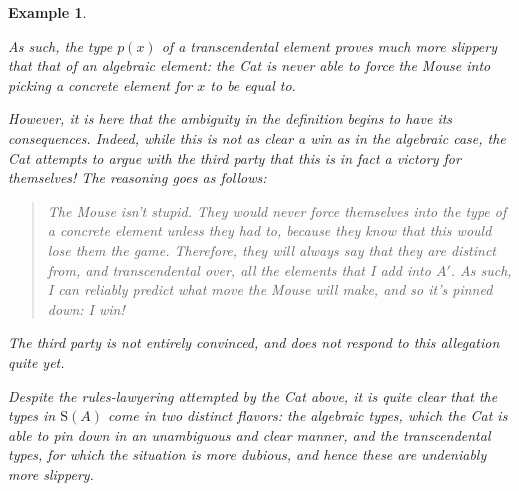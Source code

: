 \documentclass{article}
\newtheorem{example}[theorem]{Example}
\theoremstyle{nonumberplain}
\newcommand{\Stone}{\mathrm{S}}
\begin{document}
\begin{example}
\begin{itemize}
As such, the type $p(x)$ of a transcendental element proves much more slippery that that of an algebraic element: the Cat is \emph{never} able to force the Mouse into picking a concrete element for $x$ to be equal to.

However, it is here that the ambiguity in the definition begins to have its consequences. Indeed, while this is not as clear a win as in the algebraic case, the Cat attempts to argue with the third party that this is in fact a victory for themselves! The reasoning goes as follows:
\begin{quote}
The Mouse isn't stupid. They would never force themselves into the type of a concrete element unless they had to, because they know that this would lose them the game. Therefore, they will always say that they are distinct from, and transcendental over, all the elements that I add into $A'$. As such, I can reliably predict what move the Mouse will make, and so it's pinned down: \emph{I win!}
\end{quote}

The third party is not entirely convinced, and does not respond to this allegation quite yet.
\end{itemize}

Despite the rules-lawyering attempted by the Cat above, it is quite clear that the types in $\Stone(A)$ come in two distinct flavors: the algebraic types, which the Cat is able to pin down in an unambiguous and clear manner, and the transcendental types, for which the situation is more dubious, and hence these are undeniably more slippery.
\end{example}
\end{document}
